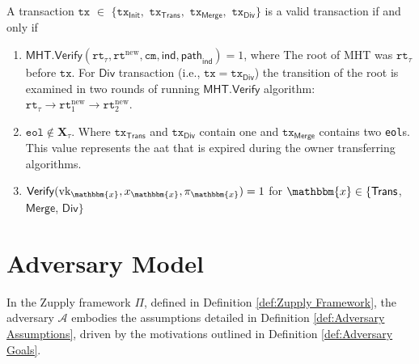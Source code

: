 \begin{definition}
\label{def:Valid Transaction}
    A transaction $\texttt{tx} $ $ \in $ $ \{ \texttt{tx}_\textsf{Init}, $ $ \texttt{tx}_\textsf{Trans}, $ $ \texttt{tx}_\textsf{Merge}, $ $ \texttt{tx}_\textsf{Div} \}$ is a valid transaction if and only if
    \begin{enumerate}
        \item $\mathsf{MHT}.\mathsf{Verify}(\texttt{rt}_{\tau}, \texttt{rt}^\text{new}, \texttt{cm}, \mathsf{ind}, \mathsf{path}_\mathsf{ind}) = 1$, where The root of \textsf{MHT} was $\texttt{rt}_{\tau}$ before $\texttt{tx}$. For $\textsf{Div}$ transaction (i.e., $\texttt{tx}= \texttt{tx}_\textsf{Div}$) the transition of the root is examined in two rounds of running $\mathsf{MHT}.\mathsf{Verify}$ algorithm: $\texttt{rt}_\tau \rightarrow \texttt{rt}^\text{new}_1 \rightarrow \texttt{rt}^\text{new}_2$. 


        \item $\texttt{eol} \notin  \mathbf{X}_\tau$. Where $\texttt{tx}_\mathsf{Trans}$ and $\texttt{tx}_\mathsf{Div}$ contain one and $\texttt{tx}_\mathsf{Merge}$ contains two \texttt{eol}s. This value represents the \gls{aat} that is expired during the owner transferring algorithms.

        \item $\mathsf{Verify}(\text{vk}_\mathbbm{x}, x_\mathbbm{x}, \pi_\mathbbm{x}) = 1$ for $\mathbbm{x} \in \{\mathsf{Trans}$, $\mathsf{Merge}$, $\mathsf{Div} \}$
        
    \end{enumerate}
\end{definition}

\section{Adversary Model}
\label{sec:Attacker Model}
\begin{definition}
\label{def:Adversary}
    In the Zupply framework $\Pi$, defined in Definition \ref{def:Zupply Framework}, the adversary $\mathcal{A}$ embodies the assumptions detailed in Definition \ref{def:Adversary Assumptions}, driven by the motivations outlined in Definition \ref{def:Adversary Goals}.
\end{definition}


